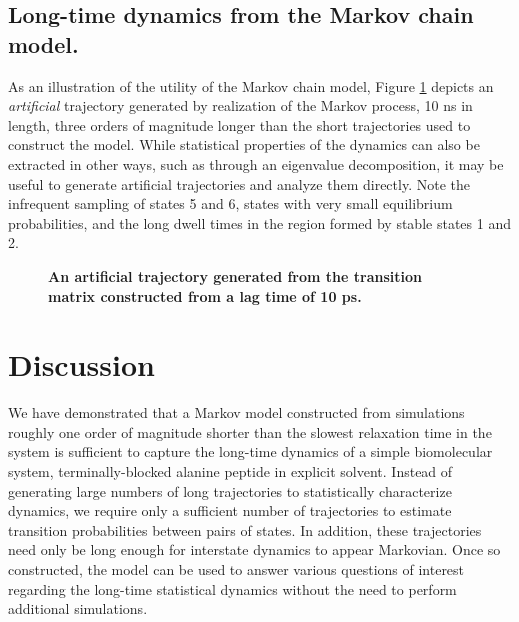 \subsection{Long-time dynamics from the Markov chain model.}

As an illustration of the utility of the Markov chain model, Figure \ref{long-times:figure:artificial-trajectory} depicts an \emph{artificial} trajectory generated by realization of the Markov process, 10 ns in length, three orders of magnitude longer than the short trajectories used to construct the model.
While statistical properties of the dynamics can also be extracted in other ways, such as through an eigenvalue decomposition, it may be useful to generate artificial trajectories and analyze them directly.
Note the infrequent sampling of states 5 and 6, states with very small equilibrium probabilities, and the long dwell times in the region formed by stable states 1 and 2.

\begin{figure}[tbp]
 \begin{center}
  \end{center}
  \caption{{\bf An artificial trajectory generated from the transition matrix constructed from a lag time of 10 ps.}}
  \label{long-times:figure:artificial-trajectory}
\end{figure}
  
\section{Discussion}
\label{long-times:section:discussion}

We have demonstrated that a Markov model constructed from simulations roughly one order of magnitude shorter than the slowest relaxation time in the system is sufficient to capture the long-time dynamics of a simple biomolecular system, terminally-blocked alanine peptide in explicit solvent.
Instead of generating large numbers of long trajectories to statistically characterize dynamics, we require only a sufficient number of trajectories to estimate transition probabilities between pairs of states.
In addition, these trajectories need only be long enough for interstate dynamics to appear Markovian.
Once so constructed, the model can be used to answer various questions of interest regarding the long-time statistical dynamics without the need to perform additional simulations.

